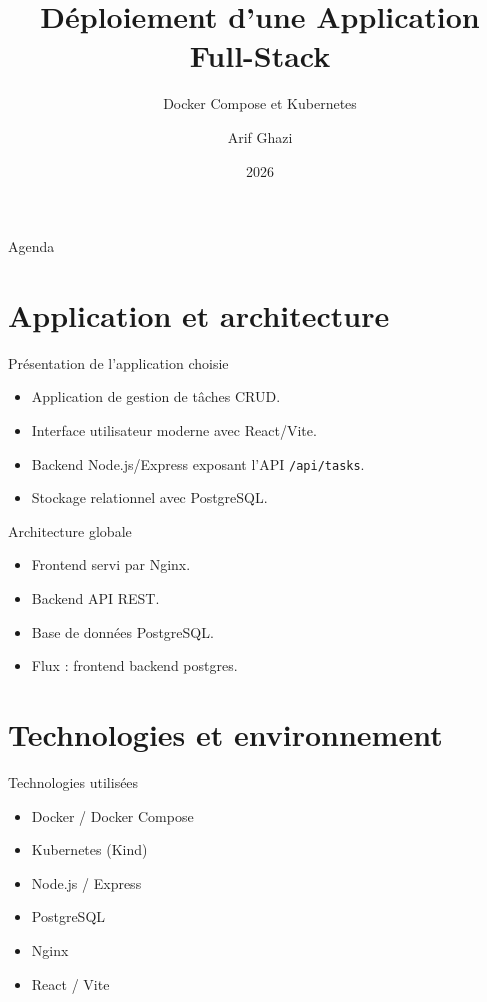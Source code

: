 \documentclass[11pt]{beamer}
\title{Déploiement d'une Application Full-Stack}
\subtitle{Docker Compose et Kubernetes}
\author{Arif Ghazi}
\institute{ISET Tozeur - M1 DevOps}
\date{2026}
\begin{document}
\begin{frame}
  \titlepage
\end{frame}

\begin{frame}{Agenda}
  \tableofcontents
\end{frame}

\section{Application et architecture}
\begin{frame}{Présentation de l'application choisie}
  \begin{itemize}
    \item Application de gestion de tâches CRUD.
    \item Interface utilisateur moderne avec React/Vite.
    \item Backend Node.js/Express exposant l'API \texttt{/api/tasks}.
    \item Stockage relationnel avec PostgreSQL.
  \end{itemize}
\end{frame}

\begin{frame}{Architecture globale}
  \begin{itemize}
    \item Frontend servi par Nginx.
    \item Backend API REST.
    \item Base de données PostgreSQL.
    \item Flux : frontend \textrightarrow backend \textrightarrow postgres.
  \end{itemize}
\end{frame}

\section{Technologies et environnement}
\begin{frame}{Technologies utilisées}
  \begin{itemize}
    \item Docker / Docker Compose
    \item Kubernetes (Kind)
    \item Node.js / Express
    \item PostgreSQL
    \item Nginx
    \item React / Vite
  \end{itemize}
\end{frame}
\end{document}
